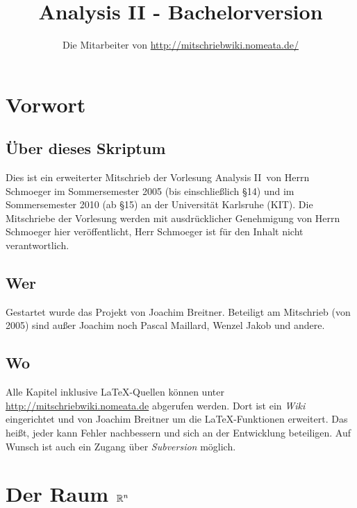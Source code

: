 \documentclass[a4paper,twoside,DIV15,BCOR12mm,chapterprefix=true,headings=twolinechapter]{scrbook}
\author{Die Mitarbeiter von \url{http://mitschriebwiki.nomeata.de/}}
\title{Analysis II - Bachelorversion}
\begin{document}
\maketitle

\renewcommand{\thechapter}{\Roman{chapter}}
\tableofcontents

\chapter{Vorwort}

\section{Über dieses Skriptum}
Dies ist ein erweiterter Mitschrieb der Vorlesung \glqq Analysis II\grqq\ von Herrn Schmoeger im
Sommersemester 2005 (bis einschließlich §14) und im Sommersemester 2010 (ab §15) an der Universität 
Karlsruhe (KIT). Die Mitschriebe der Vorlesung werden mit ausdrücklicher Genehmigung 
von Herrn Schmoeger hier veröffentlicht, Herr Schmoeger ist für den Inhalt nicht 
verantwortlich.

\section{Wer}
Gestartet wurde das Projekt von Joachim Breitner. Beteiligt am Mitschrieb (von 2005) sind außer Joachim
noch Pascal Maillard, Wenzel Jakob und andere.

\section{Wo}
Alle Kapitel inklusive \LaTeX-Quellen können unter \url{http://mitschriebwiki.nomeata.de} abgerufen werden.
Dort ist ein \emph{Wiki} eingerichtet und von Joachim Breitner um die \LaTeX-Funktionen erweitert.
Das heißt, jeder kann Fehler nachbessern und sich an der Entwicklung
beteiligen. Auf Wunsch ist auch ein Zugang über \emph{Subversion} möglich.


\renewcommand{\thechapter}{\arabic{chapter}}
\renewcommand{\chaptername}{§}
\setcounter{chapter}{0}

\chapter{Der Raum $\mathbb{R}^n$}
\end{document}
